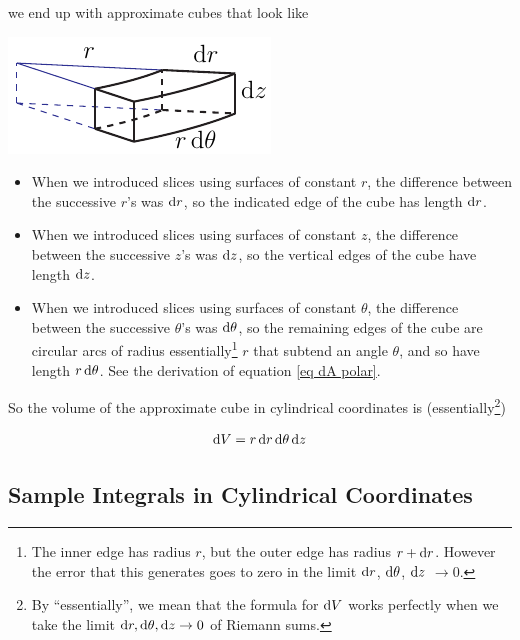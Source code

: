 we end up with approximate cubes that look like
\begin{efig}
\begin{center}
    \includegraphics{cylCube.pdf}
\end{center}
\end{efig}
\begin{itemize}
\item 
When we introduced slices using surfaces of constant $r$, 
the difference between the successive $r$'s was $\mathrm{d}r$, so the indicated
edge of the cube has length $\mathrm{d}r$.
\item 
When we introduced slices using surfaces of constant $z$, 
the difference between the successive $z$'s was $\mathrm{d}z$, so the vertical 
edges of the cube have length $\mathrm{d}z$.
\item 
When we introduced slices using surfaces of constant $\theta$, 
the difference between the successive $\theta$'s was $\mathrm{d}\theta$, so
the remaining edges of the cube are circular arcs of radius 
essentially\footnote{The inner edge has radius $r$,
but the outer edge has radius $r+\mathrm{d}r$. However the
error that this generates goes to zero in the limit $\mathrm{d}r$, $\mathrm{d}\theta$,
$\mathrm{d}z$ $\rightarrow 0$.} $r$ that subtend an angle $\theta$, and 
so have length $r\,\mathrm{d}\theta$. See the derivation of equation 
\eqref{eq dA polar}.
\end{itemize}
So the volume of the approximate cube in cylindrical coordinates is
(essentially\footnote{By ``essentially'', we mean that the formula for
$\mathrm{d}V$ works perfectly when we take the limit $\mathrm{d}r,\mathrm{d}\theta,
\mathrm{d}z\rightarrow 0$ of Riemann sums.})
\begin{impeqn}\label{eq dV cylindrical}
\begin{equation*}
\mathrm{d}V = r\,\mathrm{d}r\,\mathrm{d}\theta\,\mathrm{d}z
\end{equation*}
\end{impeqn}

\subsection{Sample Integrals in Cylindrical Coordinates} \label{sec cylindrical eg}

